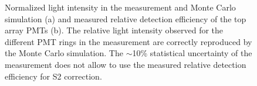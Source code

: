 \begin{figure}[!h]
\centering
{}
\caption[Normalized light intensity in the measurement and Monte Carlo simulation and measured relative detection efficiency of the top array PMTs]{Normalized light intensity in the measurement and Monte Carlo simulation (a) and measured relative detection efficiency of the top array PMTs (b). The relative light intensity observed for the different PMT rings in the measurement are correctly reproduced by the Monte Carlo simulation. The $\sim$10\% statistical uncertainty of the measurement does not allow to use the measured relative detection efficiency for S2 correction.}
\label{figQEtopArray}
\end{figure}


